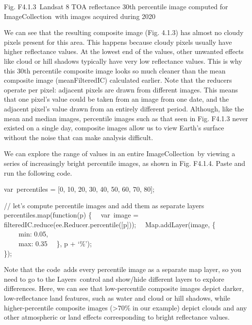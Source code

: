 \documentclass[
  letterpaper,
  DIV=11,
  numbers=noendperiod]{scrreprt}
\begin{document}
Fig. F4.1.3~Landsat 8 TOA reflectance 30th percentile image computed for
ImageCollection~with images acquired during 2020~

We can see that the resulting composite image (Fig. 4.1.3) has almost no
cloudy pixels present for this area. This happens because cloudy pixels
usually have higher reflectance values. At the lowest end of the values,
other unwanted effects like cloud or hill shadows typically have very
low reflectance values. This is why this 30th percentile composite image
looks so much cleaner than the mean composite image (meanFilteredIC)
calculated earlier. Note that the reducers operate per pixel: adjacent
pixels are drawn from different images. This means that one pixel's
value could be taken from an image from one date, and the adjacent
pixel's value drawn from an entirely different period. Although, like
the mean and median images, percentile images such as that seen in Fig.
F4.1.3 never existed on a single day, composite images allow us to view
Earth's surface without the noise that can make analysis difficult.

We can explore the range of values in an entire ImageCollection~by
viewing a series of increasingly bright percentile images, as shown in
Fig. F4.1.4. Paste and run the following code.

var~percentiles = {[}0, 10, 20, 30, 40, 50, 60, 70, 80{]};

// let's compute percentile images and add them as separate layers\\
percentiles.map(function(p) \{~ ~var~image =
filteredIC.reduce(ee.Reducer.percentile({[}p{]}));~ ~Map.addLayer(image,
\{\\
\hspace*{0.333em} ~ ~ ~min: 0.05,\\
\hspace*{0.333em} ~ ~ ~max: 0.35~ ~\}, p + `\%');\\
\});

Note that the code~adds every percentile image as a separate map layer,
so you need to go to the Layers~control and show/hide different layers
to explore differences. Here, we can see that low-percentile composite
images depict darker, low-reflectance land features, such as water and
cloud or hill shadows, while higher-percentile composite images
(\textgreater70\% in our example) depict clouds and any other
atmospheric or land effects corresponding to bright reflectance values.
\end{document}
